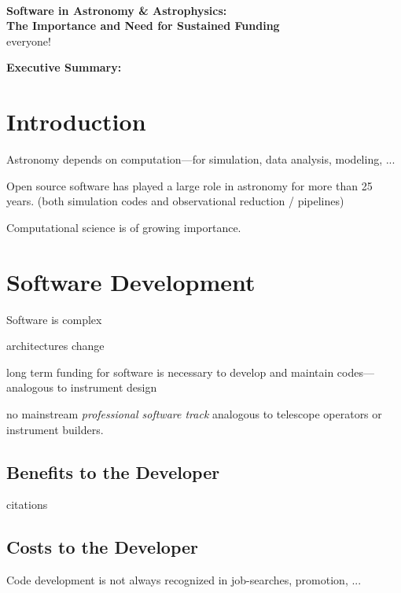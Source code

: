 \documentclass[11pt]{article}
\begin{document}
\thispagestyle{plain}

\mbox{ }\vspace{-0.7in}

\begin{center}
{\Large \sffamily \bfseries Software in Astronomy \& Astrophysics:\\The Importance and Need for Sustained Funding} \\
{
everyone!
}
\end{center}

\begin{tcolorbox}
{\sffamily \bfseries Executive Summary:} 
\end{tcolorbox}

\section{Introduction}

Astronomy depends on computation---for simulation, data analysis, modeling, ...

Open source software has played a large role in astronomy for more than
25 years.  (both simulation codes and observational reduction / pipelines)

Computational science is of growing importance.


\section{Software Development}

Software is complex

architectures change

long term funding for software is necessary to develop and maintain
codes---analogous to instrument design

no mainstream {\em professional software track} analogous to telescope
operators or instrument builders.


\subsection{Benefits to the Developer}

citations


\subsection{Costs to the Developer}

Code development is not always recognized in job-searches, promotion, ...
\end{document}
